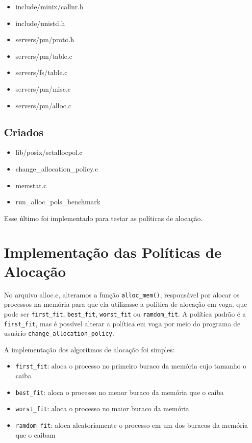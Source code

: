 \documentclass[a4paper, 12pt]{article}
\begin{document}
\begin{itemize}
	\item include/minix/callnr.h
	\item include/unistd.h
	\item servers/pm/proto.h
	\item servers/pm/table.c
	\item servers/fs/table.c
	\item servers/pm/misc.c
	\item servers/pm/alloc.c
\end{itemize}	

\subsection{Criados}

\begin{itemize}
	\item lib/posix/setallocpol.c
	\item change\_allocation\_policy.c
	\item memstat.c
	\item run\_alloc\_pols\_benchmark
\end{itemize}

Esse último foi implementado para testar as políticas de alocação.

\section{Implementação das Políticas de Alocação}

No arquivo alloc.c, alteramos a função \texttt{alloc\_mem()}, responsável por alocar os processos na memória para que ela utilizasse a política de alocação em voga, que pode ser \texttt{first\_fit}, \texttt{best\_fit}, \texttt{worst\_fit} ou \texttt{ramdom\_fit}. A política padrão é a \texttt{first\_fit}, mas é possível alterar a política em voga por meio do programa de usuário \texttt{change\_allocation\_policy}.

A implementação dos algoritmos de alocação foi simples: 

\begin{itemize}
    \item \texttt{first\_fit}: aloca o processo no primeiro buraco da memória cujo tamanho o caiba
    \item \texttt{best\_fit}: aloca o processo no menor buraco da memória que o caiba
    \item \texttt{worst\_fit}: aloca o processo no maior buraco da memória
    \item \texttt{ramdom\_fit}: aloca aleatoriamente o processo em um dos buracos da memória que o caibam
\end{itemize}
\end{document}
